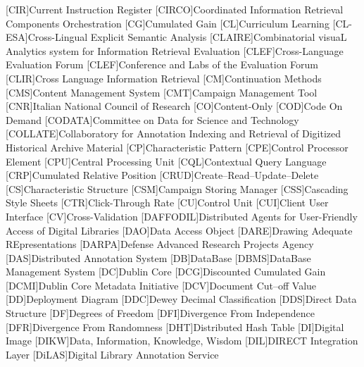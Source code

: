 [CIR]{Current Instruction Register}
[CIRCO]{Coordinated Information Retrieval Components Orchestration}
[CG]{Cumulated Gain}
[CL]{Curriculum Learning}
[CL-ESA]{Cross-Lingual Explicit Semantic Analysis}
[CLAIRE]{Combinatorial visuaL Analytics system for Information Retrieval Evaluation}
[CLEF]{Cross-Language Evaluation Forum}
[CLEF]{Conference and Labs of the Evaluation Forum}
[CLIR]{Cross Language Information Retrieval}
[CM]{Continuation Methods}
[CMS]{Content Management System}
[CMT]{Campaign Management Tool}
[CNR]{Italian National Council of Research}
[CO]{Content-Only}
[COD]{Code On Demand}
[CODATA]{Committee on Data for Science and Technology}
[COLLATE]{Collaboratory for Annotation Indexing and Retrieval of Digitized Historical Archive Material}
[CP]{Characteristic Pattern}
[CPE]{Control Processor Element}
[CPU]{Central Processing Unit}
[CQL]{Contextual Query Language}
[CRP]{Cumulated Relative Position}
[CRUD]{Create--Read--Update--Delete}
[CS]{Characteristic Structure}
[CSM]{Campaign Storing Manager}
[CSS]{Cascading Style Sheets}
[CTR]{Click-Through Rate}
[CU]{Control Unit}
[CUI]{Client User Interface}
[CV]{Cross-Validation}
[DAFFODIL]{Distributed Agents for User-Friendly Access of Digital Libraries}
[DAO]{Data Access Object}
[DARE]{Drawing Adequate REpresentations}
[DARPA]{Defense Advanced Research Projects Agency}
[DAS]{Distributed Annotation System}
[DB]{DataBase}
[DBMS]{DataBase Management System}
[DC]{Dublin Core}
[DCG]{Discounted Cumulated Gain}
[DCMI]{Dublin Core Metadata Initiative}
[DCV]{Document Cut--off Value}
[DD]{Deployment Diagram}
[DDC]{Dewey Decimal Classification}
[DDS]{Direct Data Structure}
[DF]{Degrees of Freedom}
[DFI]{Divergence From Independence}
[DFR]{Divergence From Randomness}
[DHT]{Distributed Hash Table}
[DI]{Digital Image}
[DIKW]{Data, Information, Knowledge, Wisdom}
[DIL]{\acs{DIRECT} Integration Layer}
[DiLAS]{Digital Library Annotation Service}
